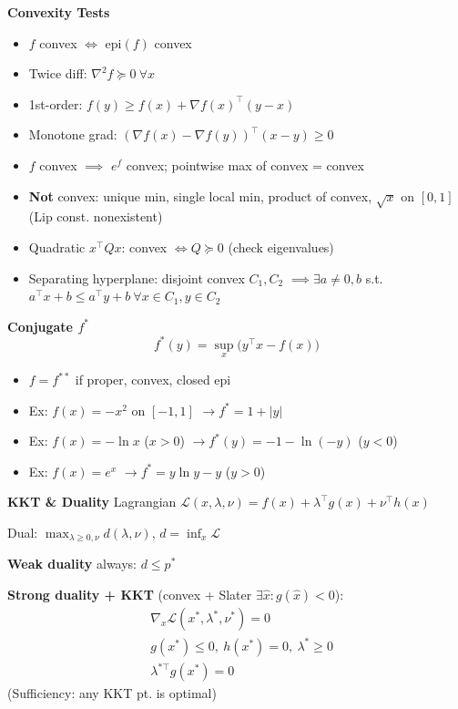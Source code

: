 \textbf{Convexity Tests}
\begin{itemize}
  \item \(f\) convex $\iff$ epi\((f)\) convex
  \item Twice diff: \(\nabla^2f\succeq0\ \forall x\)
  \item 1st-order: \(f(y)\ge f(x)+\nabla f(x)^\top(y-x)\)
  \item Monotone grad: \((\nabla f(x)-\nabla f(y))^\top(x-y)\ge0\)
  \item \(f\) convex \(\implies\) \(e^f\) convex; pointwise max of
    convex = convex
  \item \textbf{Not} convex: unique min, single local min, product of
    convex, \(\sqrt x\) on \([0,1]\) (Lip const. nonexistent)
  \item Quadratic \(x^\top Qx\): convex \(\iff Q\succeq0\) (check eigenvalues)
  \item Separating hyperplane: disjoint convex \(C_1,C_2\)
    \(\implies\exists a\neq0,b\) s.t. \(a^\top x+b\le a^\top
    y+b\ \forall x\in C_1,y\in C_2\)
\end{itemize}

\textbf{Conjugate \(f^*\)}
\[
  f^*(y)=\sup_x\bigl(y^\top x-f(x)\bigr)
\]
\begin{itemize}
  \item \(f=f^{**}\) if proper, convex, closed epi
  \item Ex: \(f(x)=-x^2\) on \([-1,1]\) \(\to f^*=1+|y|\)
  \item Ex: \(f(x)=-\ln x\) (\(x>0\)) \(\to f^*(y)=-1-\ln(-y)\) (\(y<0\))
  \item Ex: \(f(x)=e^x\) \(\to f^*=y\ln y-y\) (\(y>0\))
\end{itemize}

\textbf{KKT \& Duality}
Lagrangian \(\mathcal L(x,\lambda,\nu)=f(x)+\lambda^\top g(x)+\nu^\top h(x)\)

Dual: \(\max_{\lambda\ge0,\nu}d(\lambda,\nu)\), \(d=\inf_x\mathcal L\)

\textbf{Weak duality} always: \(d\le p^*\)

\textbf{Strong duality + KKT} (convex + Slater \(\exists\hat x:g(\hat x)<0\)):
\begin{align*}
  &\nabla_x\mathcal L(x^*,\lambda^*,\nu^*)=0\\
  &g(x^*)\le0,\ h(x^*)=0,\ \lambda^*\ge0\\
  &\lambda^{*\top}g(x^*)=0
\end{align*}
(Sufficiency: any KKT pt. is optimal)

